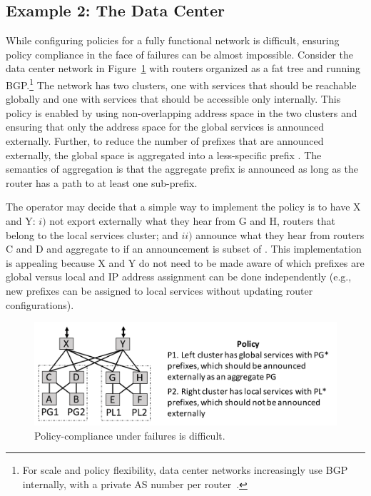 \subsection{Example 2:  The Data Center}

 While configuring policies for a fully functional network is difficult, ensuring policy compliance in the face of failures can be almost impossible. Consider the data center network in Figure~\ref{fig:example2} with routers organized as a fat tree and running BGP.\footnote{For scale and policy flexibility, data center networks increasingly use BGP internally, with a private AS number per router~\cite{bgp-in-dc}.} The network has two clusters, one with services that should be reachable globally and one with services that should be accessible only internally. This policy is enabled by using non-overlapping address space in the two clusters and ensuring that only the address space for the global services is announced externally. Further, to reduce the number of prefixes that are announced externally, the global space is aggregated into a less-specific prefix . The semantics of aggregation is that the aggregate prefix is announced as long as the router has a path to at least one sub-prefix.

The operator may decide that a simple way to implement the policy is to have X and Y: $i)$ not export externally what they hear from G and H, routers that belong to the local services cluster; and $ii)$ announce what they hear from routers C and D and aggregate to  if an announcement is subset of . This implementation is appealing because X and Y do not need to be made aware of which prefixes are global versus local and IP address assignment can be done independently (e.g., new prefixes can be assigned to local services without updating router configurations).

\begin{figure}[t!]
  \centering
  \includegraphics[width=\columnwidth]{figures/example2}
  \caption{Policy-compliance under failures is difficult.}
  \label{fig:example2}
  \vspace{-1em}
\end{figure}


